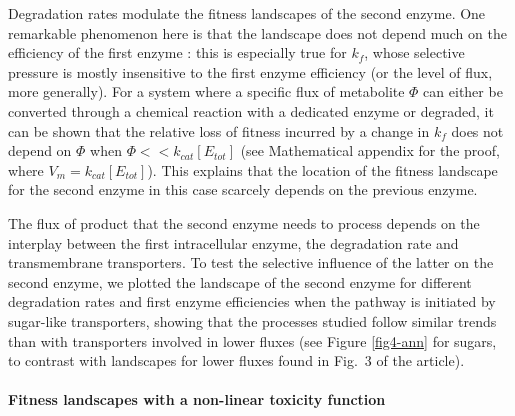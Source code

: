 Degradation rates modulate the fitness landscapes of the second enzyme. One remarkable phenomenon here is that the landscape does not depend much on the efficiency of the first enzyme : this is especially true for $k_f$, whose selective pressure is mostly insensitive to the first enzyme efficiency (or the level of flux, more generally). For a system where a specific flux of metabolite $\Phi$ can either be converted through a chemical reaction with a dedicated enzyme or degraded, it can be shown that the relative loss of fitness incurred by a change in $k_f$ does not depend on $\Phi$ when $\Phi<<k_{cat}[E_{tot}]$ (see Mathematical appendix for the proof, where $V_m=k_{cat}[E_{tot}]$). This explains that the location of the fitness landscape for the second enzyme in this case scarcely depends on the previous enzyme.

The flux of product that the second enzyme needs to process depends on the interplay between the first intracellular enzyme, the degradation rate and transmembrane transporters. To test the selective influence of the latter on the second enzyme, we plotted the landscape of the second enzyme for different degradation rates and first enzyme efficiencies when the pathway is initiated by sugar-like transporters, showing that the processes studied follow similar trends than with transporters involved in lower fluxes (see Figure \ref{fig4-ann} for sugars, to contrast with landscapes for lower fluxes found in Fig.~3 of the article).

\noindent\paragraph{Fitness landscapes with a non-linear toxicity function}

